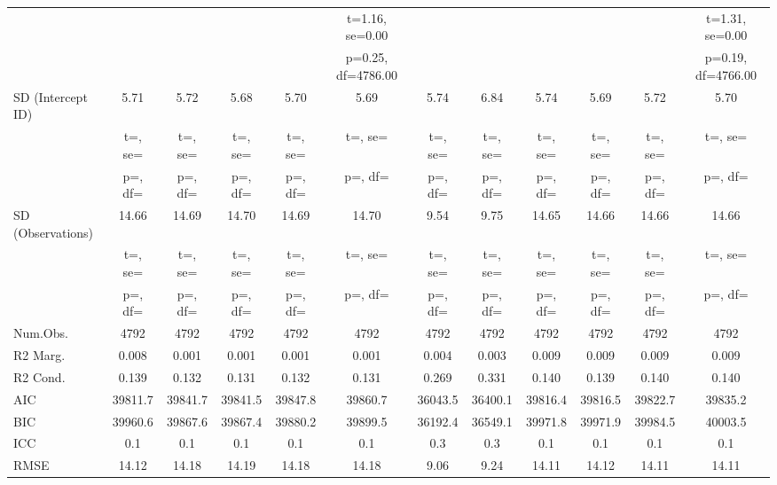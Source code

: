 \documentclass[]{report}
\begin{document}
\begin{table}
{\begin{tabular}[t]{lccccccccccc}
		&  &  &  &  & t=\num{1.16}, se=\num{0.00} &  &  &  &  &  & t=\num{1.31}, se=\num{0.00}\\
		&  &  &  &  & p=\num{0.25}, df=\num{4786.00} &  &  &  &  &  & p=\num{0.19}, df=\num{4766.00}\\
		SD (Intercept ID) & \num{5.71} & \num{5.72} & \num{5.68} & \num{5.70} & \num{5.69} & \num{5.74} & \num{6.84} & \num{5.74} & \num{5.69} & \num{5.72} & \num{5.70}\\
		& t=, se= & t=, se= & t=, se= & t=, se= & t=, se= & t=, se= & t=, se= & t=, se= & t=, se= & t=, se= & t=, \vphantom{1} se=\\
		& p=, df= & p=, df= & p=, df= & p=, df= & p=, df= & p=, df= & p=, df= & p=, df= & p=, df= & p=, df= & p=, \vphantom{1} df=\\
		SD (Observations) & \num{14.66} & \num{14.69} & \num{14.70} & \num{14.69} & \num{14.70} & \num{9.54} & \num{9.75} & \num{14.65} & \num{14.66} & \num{14.66} & \num{14.66}\\
		& t=, se= & t=, se= & t=, se= & t=, se= & t=, se= & t=, se= & t=, se= & t=, se= & t=, se= & t=, se= & t=, se=\\
		& p=, df= & p=, df= & p=, df= & p=, df= & p=, df= & p=, df= & p=, df= & p=, df= & p=, df= & p=, df= & p=, df=\\
		\midrule
		Num.Obs. & \num{4792} & \num{4792} & \num{4792} & \num{4792} & \num{4792} & \num{4792} & \num{4792} & \num{4792} & \num{4792} & \num{4792} & \num{4792}\\
		R2 Marg. & \num{0.008} & \num{0.001} & \num{0.001} & \num{0.001} & \num{0.001} & \num{0.004} & \num{0.003} & \num{0.009} & \num{0.009} & \num{0.009} & \num{0.009}\\
		R2 Cond. & \num{0.139} & \num{0.132} & \num{0.131} & \num{0.132} & \num{0.131} & \num{0.269} & \num{0.331} & \num{0.140} & \num{0.139} & \num{0.140} & \num{0.140}\\
		AIC & \num{39811.7} & \num{39841.7} & \num{39841.5} & \num{39847.8} & \num{39860.7} & \num{36043.5} & \num{36400.1} & \num{39816.4} & \num{39816.5} & \num{39822.7} & \num{39835.2}\\
		BIC & \num{39960.6} & \num{39867.6} & \num{39867.4} & \num{39880.2} & \num{39899.5} & \num{36192.4} & \num{36549.1} & \num{39971.8} & \num{39971.9} & \num{39984.5} & \num{40003.5}\\
		ICC & \num{0.1} & \num{0.1} & \num{0.1} & \num{0.1} & \num{0.1} & \num{0.3} & \num{0.3} & \num{0.1} & \num{0.1} & \num{0.1} & \num{0.1}\\
		RMSE & \num{14.12} & \num{14.18} & \num{14.19} & \num{14.18} & \num{14.18} & \num{9.06} & \num{9.24} & \num{14.11} & \num{14.12} & \num{14.11} & \num{14.11}\\
		\bottomrule
	\end{tabular}}
\end{table}
\end{document}
